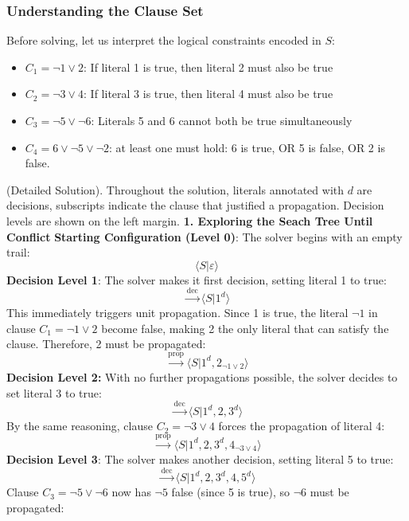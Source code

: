 \documentclass[a4paper]{article}
\theoremstyle{definition}
\begin{document}
\subsubsection{Understanding the Clause Set}
Before solving, let us interpret the logical constraints encoded in \( S \):
\begin{itemize}
  \item \( C_1 = \lnot 1 \vee 2 \): If literal 1 is true, then literal 2 must also be true 
  \item \( C_2 = \lnot 3 \vee 4 \): If literal 3 is true, then literal 4 must also be true 
  \item \( C_3 = \lnot 5 \vee \lnot 6 \): Literals 5 and 6 cannot both be true simultaneously 
  \item \( C_4 = 6 \vee \lnot 5 \vee \lnot 2 \): at least one must hold: 6 is true, OR 5 is false, OR 2 is false.
\end{itemize}
(Detailed Solution). Throughout the solution, literals annotated with \( d \) are decisions, subscripts indicate the 
clause that justified a propagation. Decision levels are shown on the left margin.
\vspace{1em}
\noindent 
\newline
\textbf{1. Exploring the Seach Tree Until Conflict}
\vspace{1em}
\noindent 
\newline
\textbf{Starting Configuration (Level 0)}: The solver begins with an empty trail:
\[
  \langle S \vert \varepsilon \rangle
\]
\textbf{Decision Level 1}: The solver makes it first decision, setting literal 1 to true:
\[
  \xrightarrow{\text{dec}} \langle S \vert 1^d \rangle
\]
This immediately triggers unit propagation. Since 1 is true, the literal \( \lnot 1 \) in clause \( C_1 = \lnot 1 \vee 2 \) become false,
making 2 the only literal that can satisfy the clause. Therefore, 2 must be propagated:
\[
  \xrightarrow{\text{prop}} \langle S \vert 1^d, 2_{\lnot 1 \vee 2} \rangle
\]
\textbf{Decision Level 2:} With no further propagations possible, the solver decides to set literal 3 to true:
\[
  \xrightarrow{\text{dec}} \langle S \vert 1^d, 2, 3^d \rangle 
\]
By the same reasoning, clause \( C_2 = \lnot 3 \vee 4 \) forces the propagation of literal 4:
\[
  \xrightarrow{\text{prop}} \langle S \vert 1^d, 2, 3^d, 4_{\lnot 3 \vee 4} \rangle
\]
\textbf{Decision Level 3}: The solver makes another decision, setting literal 5 to true:
\[
  \xrightarrow{\text{dec}} \langle S \vert 1^d, 2, 3^d, 4, 5^d \rangle
\]
Clause \( C_3 = \lnot 5 \vee \lnot 6 \) now has \( \lnot 5 \) false (since 5 is true), so \( \lnot 6 \) must be propagated:
\end{document}
